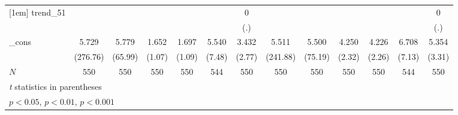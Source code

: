 {\begin{tabular}{l*{12}{c}}
[1em]
trend\_51    &                     &                     &                     &                     &                     &           0         &                     &                     &                     &                     &                     &           0         \\
            &                     &                     &                     &                     &                     &         (.)         &                     &                     &                     &                     &                     &         (.)         \\
[1em]
\_cons      &       5.729\sym{***}&       5.779\sym{***}&       1.652         &       1.697         &       5.540\sym{***}&       3.432\sym{**} &       5.511\sym{***}&       5.500\sym{***}&       4.250\sym{*}  &       4.226\sym{*}  &       6.708\sym{***}&       5.354\sym{**} \\
            &    (276.76)         &     (65.99)         &      (1.07)         &      (1.09)         &      (7.48)         &      (2.77)         &    (241.88)         &     (75.19)         &      (2.32)         &      (2.26)         &      (7.13)         &      (3.31)         \\
\hline
\(N\)       &         550         &         550         &         550         &         550         &         544         &         550         &         550         &         550         &         550         &         550         &         544         &         550         \\
\hline\hline
\multicolumn{13}{l}{\footnotesize \textit{t} statistics in parentheses}\\
\multicolumn{13}{l}{\footnotesize \sym{*} \(p<0.05\), \sym{**} \(p<0.01\), \sym{***} \(p<0.001\)}\\
\end{tabular}
}
